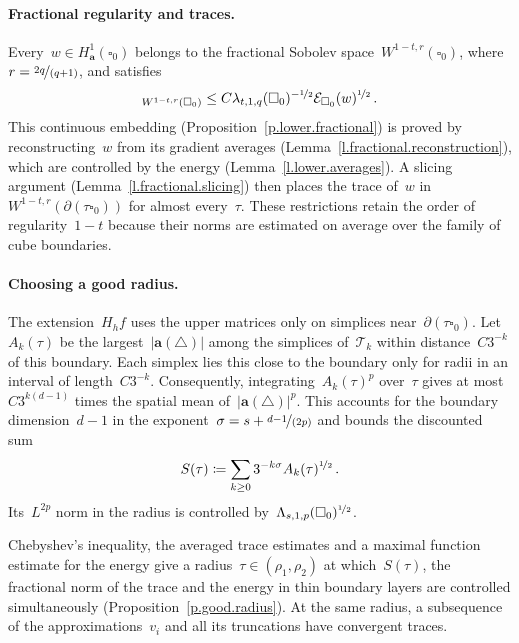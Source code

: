 \documentclass[11pt,letterpaper]{article}
\numberwithin{equation}{section}
\theoremstyle{definition}
\renewcommand{\a}{\mathbf{a}}
\newcommand{\nf}{\nicefrac}
\newcommand{\cu}{\square}
\newcommand{\Ener}{\mathcal E}
\begin{document}
\paragraph{Fractional regularity and traces.} Every~$w\in H^1_\a(\cu_0)$ belongs to the fractional Sobolev space~$W^{1-t,r}(\cu_0)$, where~$r=\nf{2q}{(q+1)}$, and satisfies
\begin{equation*}
    [w]_{W^{1-t,r}(\cu_0)}
    \leq C\lambda_{t,1,q}(\cu_0)^{-\nf12}
    \Ener_{\cu_0}(w)^{\nf12}
    \,.
\end{equation*}
This continuous embedding (Proposition~\ref{p.lower.fractional}) is proved by reconstructing~$w$ from its gradient averages (Lemma~\ref{l.fractional.reconstruction}), which are controlled by the energy (Lemma~\ref{l.lower.averages}). A slicing argument (Lemma~\ref{l.fractional.slicing}) then places the trace of~$w$ in~$W^{1-t,r}(\partial(\tau\cu_0))$ for almost every~$\tau$. These restrictions retain the order of regularity~$1-t$ because their norms are estimated on average over the family of cube boundaries.


\paragraph{Choosing a good radius.} The extension~$H_hf$ uses the upper matrices only on simplices near~$\partial(\tau\cu_0)$. Let~$A_k(\tau)$ be the largest~$|\a(\triangle)|$ among the simplices of~$\mathscr T_k$ within distance~$C3^{-k}$ of this boundary. Each simplex lies this close to the boundary only for radii in an interval of length~$C3^{-k}$. Consequently, integrating~$A_k(\tau)^p$ over~$\tau$ gives at most~$C3^{k(d-1)}$ times the spatial mean of~$|\a(\triangle)|^p$. This accounts for the boundary dimension~$d-1$ in the exponent~$\sigma=s+\nf{d-1}{(2p)}$ and bounds the discounted sum
\begin{equation*}
    S(\tau)\coloneqq\sum_{k\geq0}3^{-k\sigma}A_k(\tau)^{\nf12}
    \,.
\end{equation*}
Its~$L^{2p}$ norm in the radius is controlled by~$\Lambda_{s,1,p}(\cu_0)^{\nf12}$.


Chebyshev's inequality, the averaged trace estimates and a maximal function estimate for the energy give a radius~$\tau\in(\rho_1,\rho_2)$ at which~$S(\tau)$, the fractional norm of the trace and the energy in thin boundary layers are controlled simultaneously (Proposition~\ref{p.good.radius}). At the same radius, a subsequence of the approximations~$v_i$ and all its truncations have convergent traces.
\end{document}
